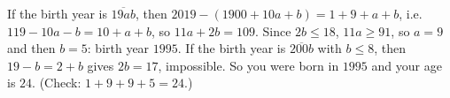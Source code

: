 If the birth year is $\overline{19ab}$, then $2019-(1900+10a+b)=1+9+a+b$, i.e.\ $119-10a-b=10+a+b$, so $11a+2b=109$. Since $2b\le18$, $11a\ge91$, so $a=9$ and then $b=5$: birth year $1995$. If the birth year is $\overline{200b}$ with $b\le8$, then $19-b=2+b$ gives $2b=17$, impossible. So you were born in $1995$ and your age is $\boxed{24}$. (Check: $1+9+9+5=24$.)
